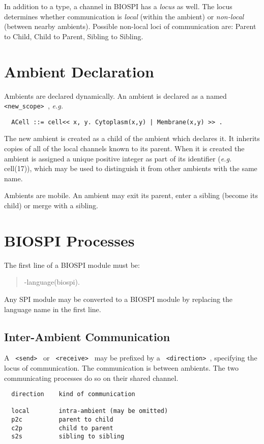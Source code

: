 In addition to a type, a channel in BIOSPI has a {\em locus} as well.  The
locus determines whether communication is {\em local} (within the ambient)
or {\em non-local} (between nearby ambients).  Possible non-local loci of
communication are: Parent to Child, Child to Parent, Sibling to
Sibling.

\section{Ambient Declaration}

Ambients are declared dynamically.
An ambient is declared as a named \verb+ <new_scope> +, {\em e.g.}

\begin{verbatim}
  ACell ::= cell<< x, y. Cytoplasm(x,y) | Membrane(x,y) >> .
\end{verbatim}

The new ambient is created as a child of the ambient which declares it.
It inherits copies of all of the local channels known to its parent.
When it is created the ambient is assigned a unique positive integer
as part of its identifier ({\em e.g.} cell(17)), which may be used
to distinguish it from other ambients with the same name.

Ambients are mobile. An ambient may
exit its parent, enter a sibling (become its child) or merge with a
sibling.

\section{BIOSPI Processes}

The first line of a BIOSPI module must be:

\begin{verse}
   -language(biospi).
\end{verse}

Any SPI module may be converted to a BIOSPI module by
replacing the language name in the first line.

\subsection{Inter-Ambient Communication}

A \verb+ <send> + or \verb+ <receive> + may be prefixed by a
\verb+ <direction> +, specifying the locus of communication.
The communication is between ambients.  The two communicating
processes do so on their shared channel.

\begin{verbatim}
  direction    kind of communication

  local        intra-ambient (may be omitted)
  p2c          parent to child
  c2p          child to parent
  s2s          sibling to sibling
\end{verbatim}

